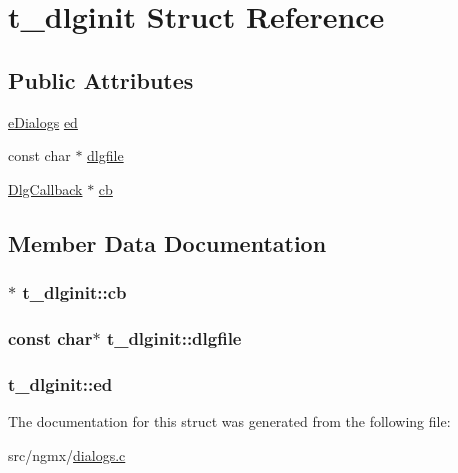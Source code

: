 \hypertarget{structt__dlginit}{\section{t\-\_\-dlginit \-Struct \-Reference}
\label{structt__dlginit}
}
\subsection*{\-Public \-Attributes}
\begin{DoxyCompactItemize}
\item 
\hyperlink{dialogs_8h_a5daa2ec1eab1ae9d5408daedaf19986c}{e\-Dialogs} \hyperlink{structt__dlginit_a0356b7555d99ed9c21060c647aa0f46f}{ed}
\item 
const char $\ast$ \hyperlink{structt__dlginit_ad70e2675da170af4eda170746e33f54e}{dlgfile}
\item 
\hyperlink{xdlg_8h_a5c5a519f0378b9db5d5483f49cb46017}{\-Dlg\-Callback} $\ast$ \hyperlink{structt__dlginit_a5e0b4d69b919abffc498635407585f8f}{cb}
\end{DoxyCompactItemize}


\subsection{\-Member \-Data \-Documentation}
\hypertarget{structt__dlginit_a5e0b4d69b919abffc498635407585f8f}{
\subsubsection[{cb}]{$\ast$ {\bf t\-\_\-dlginit\-::cb}}}\label{structt__dlginit_a5e0b4d69b919abffc498635407585f8f}
\hypertarget{structt__dlginit_ad70e2675da170af4eda170746e33f54e}{
\subsubsection[{dlgfile}]{\setlength{\rightskip}{0pt plus 5cm}const char$\ast$ {\bf t\-\_\-dlginit\-::dlgfile}}}\label{structt__dlginit_ad70e2675da170af4eda170746e33f54e}
\hypertarget{structt__dlginit_a0356b7555d99ed9c21060c647aa0f46f}{
\subsubsection[{ed}]{ {\bf t\-\_\-dlginit\-::ed}}}\label{structt__dlginit_a0356b7555d99ed9c21060c647aa0f46f}


\-The documentation for this struct was generated from the following file\-:\begin{DoxyCompactItemize}
\item 
src/ngmx/\hyperlink{dialogs_8c}{dialogs.\-c}\end{DoxyCompactItemize}
